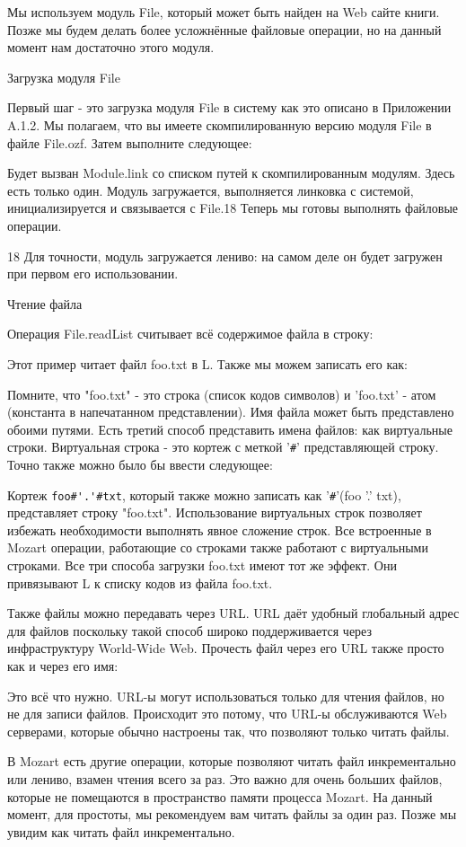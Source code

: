 Мы используем модуль File, который может быть найден на Web сайте книги. Позже мы будем делать более усложнённые файловые операции, но на данный момент нам достаточно этого модуля.

Загрузка модуля File

Первый шаг - это загрузка модуля File в систему как это описано в Приложении A.1.2. Мы полагаем, что вы имеете скомпилированную версию модуля File в файле File.ozf. Затем выполните следующее:

Будет вызван Module.link со списком путей к скомпилированным модулям. Здесь есть только один. Модуль загружается, выполняется линковка с системой, инициализируется и связывается с File.18 Теперь мы готовы выполнять файловые операции.

18 Для точности, модуль загружается лениво: на самом деле он будет загружен при первом его использовании.

Чтение файла

Операция File.readList считывает всё содержимое файла в строку:

Этот пример читает файл foo.txt в L. Также мы можем записать его как:

Помните, что "foo.txt" - это строка (список кодов символов) и 'foo.txt' - атом (константа в напечатанном представлении). Имя файла может быть представлено обоими путями. Есть третий способ представить имена файлов: как виртуальные строки. Виртуальная строка - это кортеж с меткой '\verb|#|' представляющей строку. Точно также можно было бы ввести следующее:

Кортеж \verb!foo#'.'#txt!, который также можно записать как '\verb!#!'(foo '.' txt), представляет строку "foo.txt". Использование виртуальных строк позволяет избежать необходимости выполнять явное сложение строк. Все встроенные в Mozart операции, работающие со строками также работают с виртуальными строками. Все три способа загрузки foo.txt имеют тот же эффект. Они привязывают L к списку кодов из файла foo.txt.

Также файлы можно передавать через URL. URL даёт удобный глобальный адрес для файлов поскольку такой способ широко поддерживается через инфраструктуру World-Wide Web. Прочесть файл через его URL также просто как и через его имя:

Это всё что нужно. URL-ы могут использоваться только для чтения файлов, но не для записи файлов. Происходит это потому, что URL-ы обслуживаются Web серверами, которые обычно настроены так, что позволяют только читать файлы.

В Mozart есть другие операции, которые позволяют читать файл инкрементально или лениво, взамен чтения всего за раз. Это важно для очень больших файлов, которые не помещаются в пространство памяти процесса Mozart. На данный момент, для простоты, мы рекомендуем вам читать файлы за один раз. Позже мы увидим как читать файл инкрементально.

